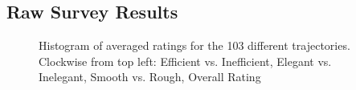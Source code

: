 \documentclass[letterpaper, 10 pt, conference]{ieeeconf}  %
\begin{document}
\subsection{Raw Survey Results}
\begin{figure}[h]
  \caption{Histogram of averaged ratings for the 103 different trajectories. Clockwise from top left: Efficient vs. Inefficient, Elegant vs. Inelegant, Smooth vs. Rough, Overall Rating}
\label{fig:survey_raw}
\end{figure}
\end{document}

